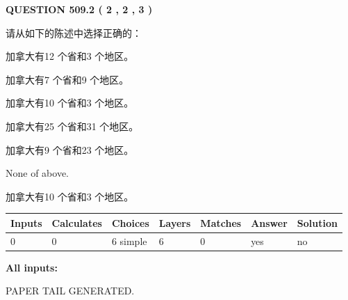 \documentclass{ctexart}
\begin{document}
   
  
\vspace{0.2in}
  
{\textbf{\Large{QUESTION
509.2 
 ( 2 , 2 , 3 )
}}}
  
  
请从如下的陈述中选择正确的：
 
 
加拿大有12 个省和3 个地区。
 
 
加拿大有7 个省和9 个地区。
 
 
加拿大有10 个省和3 个地区。
 
 
加拿大有25 个省和31 个地区。
 
 
加拿大有9 个省和23 个地区。
 
 
 None of above.
 
 
\noindent{}
 
 
加拿大有10 个省和3 个地区。
 
 
\noindent{}
 
 
   
   
   
   
\noindent\begin{tabular}{|l|l|l|l|l|l|l|}
 \hline
Inputs & Calculates & Choices & Layers & Matches & Answer & Solution \\ \hline
 0  & 
 0  & 
 6
  simple  
  & 
 6  & 
 0  & 
  yes & 
  no 
  \\ \hline
 \end{tabular}
   
   
   
   
\noindent{}
   
   
   
   
\noindent\vspace{0.1in}\hspace{-0.08in} {\textbf{\Large{All inputs: }}}
   
   
   
   
   
   
 \vspace{0.2in}
 
   
   
\vspace{2.0in} PAPER TAIL GENERATED.
   
\end{document}
